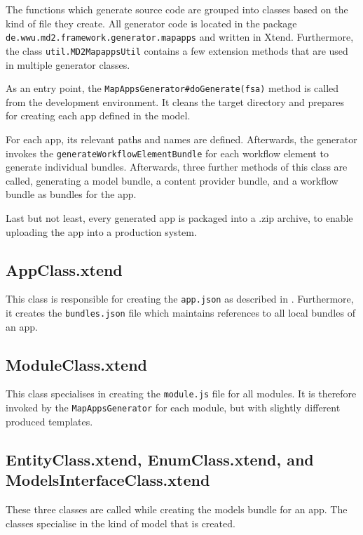 
The functions which generate \mapapps source code are grouped into classes based on the kind of file they create. All \mapapps generator code is located in the package \lstinline[language=Simple]|de.wwu.md2.framework.generator.mapapps| and written in Xtend. Furthermore, the class \lstinline|util.MD2MapappsUtil| contains a few extension methods that are used in multiple generator classes.

As an entry point, the \lstinline[language=Simple]|MapAppsGenerator#doGenerate(fsa)| method is called from the development environment. It cleans the target directory and prepares for creating  each app defined in the model.

For each app, its relevant paths and names are defined. Afterwards, the generator invokes the \lstinline|generateWorkflowElementBundle| for each workflow element to generate individual bundles. Afterwards, three further methods of this class are called, generating a model bundle, a content provider bundle, and a workflow bundle as bundles for the app.


Last but not least, every generated app is packaged into a .zip archive, to enable uploading the app into a production \mapapps system.

\subsection{AppClass.xtend}

This class is responsible for creating the \lstinline[language=Simple]|app.json| as described in . Furthermore, it creates the \lstinline[language=Simple]|bundles.json| file which maintains references to all local bundles of an app.

\subsection{ModuleClass.xtend}

This class specialises in creating the \lstinline|module.js| file for all modules. It is therefore invoked by the \lstinline|MapAppsGenerator| for each module, but with slightly different produced templates.

\subsection{EntityClass.xtend, EnumClass.xtend, and ModelsInterfaceClass.xtend}
These three classes are called while creating the models bundle for an app. 
The classes specialise in the kind of model that is created.

